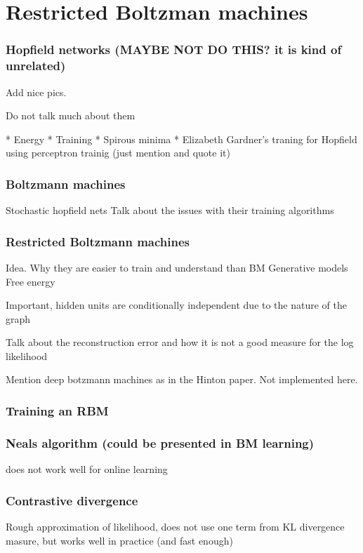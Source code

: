 \documentclass[11pt, fleqn, twoside]{article}
\begin{document}
\section{Restricted Boltzman machines}


\subsubsection{ Hopfield networks (MAYBE NOT DO THIS? it is kind of unrelated)}
  Add nice pics.

  Do not talk much about them

  * Energy
  * Training
  * Spirous minima
  * Elizabeth Gardner's traning for Hopfield using perceptron trainig (just mention and quote it)


\subsubsection{Boltzmann machines}
  Stochastic hopfield nets
  Talk about the issues with their training algorithms


\subsubsection {Restricted Boltzmann machines}
  Idea.
  Why they are easier to train and understand than BM
  Generative models
  Free energy

  Important, hidden units are conditionally independent due to the nature of the graph

  Talk about the reconstruction error and how it is not a good measure for the log likelihood

  Mention deep botzmann machines as in the Hinton paper. Not implemented here.

\subsubsection {Training an RBM}

\subsubsection {Neals algorithm (could be presented in BM learning)}
    does not work well for online learning

\subsubsection{ Contrastive divergence}
  Rough approximation of likelihood, does not use one term from KL divergence masure,
  but works well in practice (and fast enough)
\end{document}
